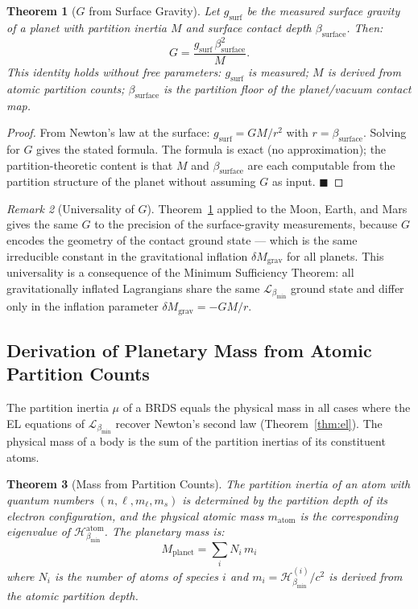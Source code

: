 \documentclass[11pt,twocolumn,a4paper]{article}
\theoremstyle{plain}
\newtheorem{theorem}{Theorem}[section]
\theoremstyle{definition}
\theoremstyle{remark}
\newtheorem{remark}[theorem]{Remark}
\newcommand{\bmin}{\beta_{\min}}
\newcommand{\Lmin}{\mathcal{L}_{\bmin}}
\newcommand{\Hmin}{\mathcal{H}_{\bmin}}
\renewcommand{\qed}{\hfill$\blacksquare$}
\begin{document}
\begin{theorem}[$G$ from Surface Gravity]
\label{thm:gfromsurface}
Let $g_{\mathrm{surf}}$ be the measured surface gravity of a planet with
partition inertia $M$ and surface contact depth $\beta_{\mathrm{surface}}$.
Then:
\[
  G = \frac{g_{\mathrm{surf}}\,\beta_{\mathrm{surface}}^2}{M}.
\]
This identity holds without free parameters: $g_{\mathrm{surf}}$ is measured;
$M$ is derived from atomic partition counts; $\beta_{\mathrm{surface}}$ is the
partition floor of the planet/vacuum contact map.
\end{theorem}

\begin{proof}
From Newton's law at the surface: $g_{\mathrm{surf}} = GM/r^2$ with
$r = \beta_{\mathrm{surface}}$. Solving for $G$ gives the stated formula.
The formula is exact (no approximation); the partition-theoretic content is
that $M$ and $\beta_{\mathrm{surface}}$ are each computable from the
partition structure of the planet without assuming $G$ as input. \qed
\end{proof}

\begin{remark}[Universality of $G$]
Theorem~\ref{thm:gfromsurface} applied to the Moon, Earth, and Mars gives the
same $G$ to the precision of the surface-gravity measurements, because $G$
encodes the geometry of the contact ground state --- which is the same irreducible
constant in the gravitational inflation $\delta M_{\mathrm{grav}}$ for all planets.
This universality is a consequence of the Minimum Sufficiency Theorem: all
gravitationally inflated Lagrangians share the same $\Lmin$ ground state and
differ only in the inflation parameter $\delta M_{\mathrm{grav}} = -GM/r$.
\end{remark}

\subsection{Derivation of Planetary Mass from Atomic Partition Counts}

The partition inertia $\mu$ of a BRDS equals the physical mass in all cases
where the EL equations of $\Lmin$ recover Newton's second law
(Theorem~\ref{thm:el}). The physical mass of a body is the sum of the partition
inertias of its constituent atoms.

\begin{theorem}[Mass from Partition Counts]
\label{thm:massfromcounts}
The partition inertia of an atom with quantum numbers $(n, \ell, m_\ell, m_s)$
is determined by the partition depth of its electron configuration, and the
physical atomic mass $m_{\mathrm{atom}}$ is the corresponding eigenvalue of
$\Hmin^{\mathrm{atom}}$. The planetary mass is:
\[
  M_{\mathrm{planet}} = \sum_{i} N_i\,m_i
\]
where $N_i$ is the number of atoms of species $i$ and $m_i = \Hmin^{(i)}/c^2$
is derived from the atomic partition depth.
\end{theorem}
\end{document}
